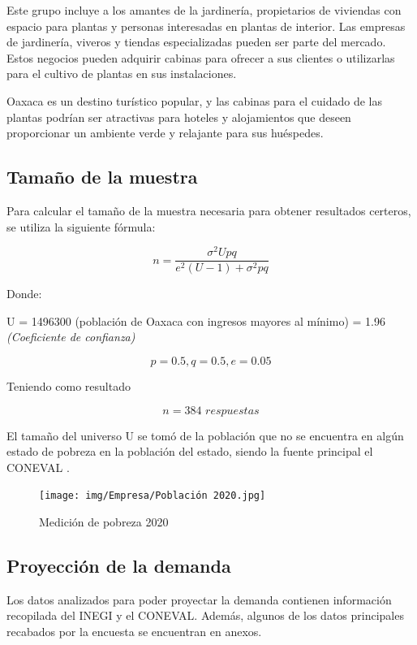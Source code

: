 Este grupo incluye a los amantes de la jardinería, propietarios de viviendas con espacio para plantas y personas interesadas en plantas de interior.
Las empresas de jardinería, viveros y tiendas especializadas pueden ser parte del mercado. Estos negocios pueden adquirir cabinas para ofrecer a sus clientes o utilizarlas para el cultivo de plantas en sus instalaciones.

Oaxaca es un destino turístico popular, y las cabinas para el cuidado de las plantas podrían ser atractivas para hoteles y alojamientos que deseen proporcionar un ambiente verde y relajante para sus huéspedes.

\subsection{Tamaño de la muestra}
Para calcular el tamaño de la muestra necesaria para obtener resultados certeros, se utiliza la siguiente fórmula:

\[
n = \frac{{\sigma^2 Upq}}{{e^2 (U - 1) + \sigma^2 pq}}
\]

Donde:

U = 1496300 (población de Oaxaca con ingresos mayores al mínimo)
{\sigma = 1.96} \textit{(Coeficiente de confianza)}

\[
p = 0.5, q=0.5, e = 0.05
\]

Teniendo como resultado 

\[
n = 384 \textit{ respuestas}
\]

El tamaño del universo U     se tomó de la población que no se encuentra en algún estado de pobreza en la población del estado, siendo la fuente principal el CONEVAL \cite{Coneval}.

\begin{figure}[H]
    \centering	
    \texttt{[image: img/Empresa/Población 2020.jpg]} 
    \caption{Medición de pobreza 2020}
\label{fig:MedicionPobreza2020}
\end{figure}

\subsection{Proyección de la demanda }
Los datos analizados para poder proyectar la demanda contienen información recopilada del INEGI \cite{Censo2020} \cite{INEGIOaxaca} y el CONEVAL. Además, algunos de los datos principales recabados por la encuesta se encuentran en anexos.

